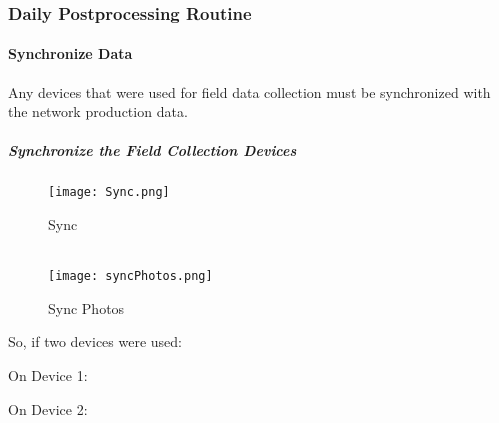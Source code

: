 
\vspace{.25in}




 \clearpage

%
%
 \subsubsection{Daily Postprocessing Routine}
 \paragraph{Synchronize Data}

 Any devices that were used for field data collection must be synchronized with the network production data.

 \vspace{.5in}

 \subparagraph{Synchronize the Field Collection Devices}

 \begin{wrapfigure}{r}{0.5\textwidth}
 \centering
     \texttt{[image: Sync.png]}
 \caption{Sync}
 \vspace{.05in}

 \HRule \\[.4cm] %
 \vspace{.05in}
     \texttt{[image: syncPhotos.png]}
 \caption{Sync Photos}

 \end{wrapfigure}
 So, if two devices were used:

 \vspace{.5in}

 \noindent On Device 1:

 \vspace{.75in}


 \vspace{1.75in}

 \noindent On Device 2:

 \vspace{.75in}


